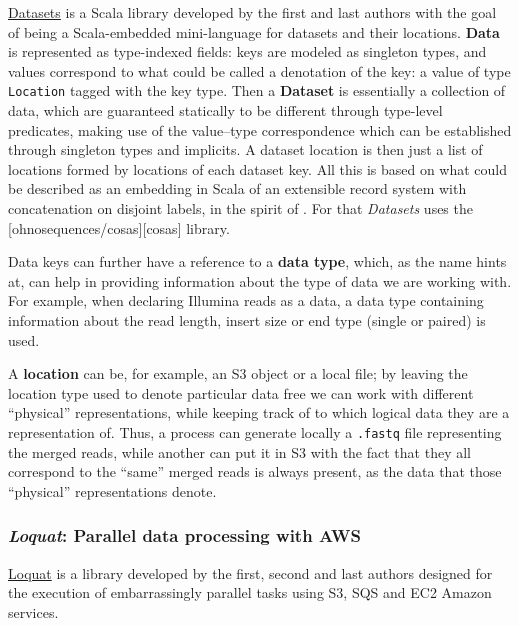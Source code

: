 \documentclass[fleqn,10pt,lineno]{wlpeerj}
\begin{document}
\protect\hyperlink{datasets}{Datasets} is a Scala library developed by
the first and last authors with the goal of being a Scala-embedded
mini-language for datasets and their locations. \textbf{Data} is
represented as type-indexed fields: keys are modeled as singleton types,
and values correspond to what could be called a denotation of the key: a
value of type \texttt{Location} tagged with the key type. Then a
\textbf{Dataset} is essentially a collection of data, which are
guaranteed statically to be different through type-level predicates,
making use of the value--type correspondence which can be established
through singleton types and implicits. A dataset location is then just a
list of locations formed by locations of each dataset key. All this is
based on what could be described as an embedding in Scala of an
extensible record system with concatenation on disjoint labels, in the
spirit of \citep{harper1990extensible} \citep{harper1991record}. For
that \emph{Datasets} uses the {[}ohnosequences/cosas{]}{[}cosas{]}
library.

Data keys can further have a reference to a \textbf{data type}, which,
as the name hints at, can help in providing information about the type
of data we are working with. For example, when declaring Illumina reads
as a data, a data type containing information about the read length,
insert size or end type (single or paired) is used.

A \textbf{location} can be, for example, an S3 object or a local file;
by leaving the location type used to denote particular data free we can
work with different ``physical'' representations, while keeping track of
to which logical data they are a representation of. Thus, a process can
generate locally a \texttt{.fastq} file representing the merged reads,
while another can put it in S3 with the fact that they all correspond to
the ``same'' merged reads is always present, as the data that those
``physical'' representations denote.

\subsubsection{\texorpdfstring{\emph{Loquat}: Parallel data processing
with
AWS}{Loquat: Parallel data processing with AWS}}\label{loquat-parallel-data-processing-with-aws}

\protect\hyperlink{loquat}{Loquat} is a library developed by the first,
second and last authors designed for the execution of embarrassingly
parallel tasks using S3, SQS and EC2 Amazon services.
\end{document}
